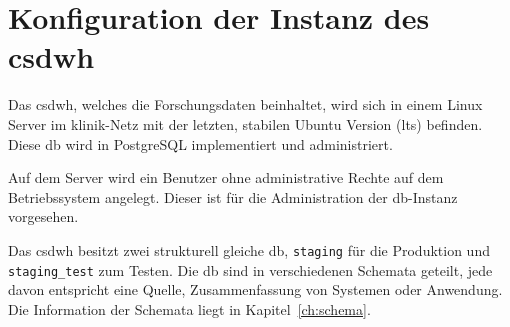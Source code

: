 \chapter{Konfiguration der Instanz des \acs{csdwh}}
    
    Das \ac{csdwh}, welches die Forschungsdaten beinhaltet, wird sich in einem Linux Server im klinik-Netz mit der letzten, stabilen Ubuntu Version (\ac{lts}) befinden. Diese \ac{db} wird in PostgreSQL implementiert und administriert.  
    
    Auf dem Server wird ein Benutzer ohne administrative Rechte auf dem Betriebssystem angelegt. Dieser ist für die Administration der \ac{db}-Instanz vorgesehen.
    
    Das \ac{csdwh} besitzt zwei strukturell gleiche \ac{db}, \texttt{staging} für die Produktion und \texttt{staging\_test} zum Testen. Die \ac{db} sind in verschiedenen Schemata geteilt, jede davon entspricht eine Quelle, Zusammenfassung von Systemen oder Anwendung. Die Information der Schemata liegt in Kapitel~\ref{ch:schema}.